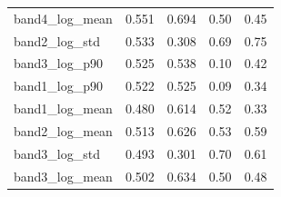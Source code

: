 \documentclass[11pt,a4paper]{article}
\begin{document}
\begin{center}
\begin{longtable}{>{\raggedright\arraybackslash}p{4.20cm}>{\raggedleft\arraybackslash}p{2.55cm}>{\raggedleft\arraybackslash}p{2.55cm}>{\raggedleft\arraybackslash}p{2.55cm}>{\raggedleft\arraybackslash}p{2.55cm}}
\hspace{0pt}band4\_\allowbreak{}log\_\allowbreak{}mean & \hspace{0pt}0.551 & \hspace{0pt}0.694 & \hspace{0pt}0.50 & \hspace{0pt}0.45\\
\hspace{0pt}band2\_\allowbreak{}log\_\allowbreak{}std & \hspace{0pt}0.533 & \hspace{0pt}0.308 & \hspace{0pt}0.69 & \hspace{0pt}0.75\\
\hspace{0pt}band3\_\allowbreak{}log\_\allowbreak{}p90 & \hspace{0pt}0.525 & \hspace{0pt}0.538 & \hspace{0pt}0.10 & \hspace{0pt}0.42\\
\hspace{0pt}band1\_\allowbreak{}log\_\allowbreak{}p90 & \hspace{0pt}0.522 & \hspace{0pt}0.525 & \hspace{0pt}0.09 & \hspace{0pt}0.34\\
\hspace{0pt}band1\_\allowbreak{}log\_\allowbreak{}mean & \hspace{0pt}0.480 & \hspace{0pt}0.614 & \hspace{0pt}0.52 & \hspace{0pt}0.33\\
\hspace{0pt}band2\_\allowbreak{}log\_\allowbreak{}mean & \hspace{0pt}0.513 & \hspace{0pt}0.626 & \hspace{0pt}0.53 & \hspace{0pt}0.59\\
\hspace{0pt}band3\_\allowbreak{}log\_\allowbreak{}std & \hspace{0pt}0.493 & \hspace{0pt}0.301 & \hspace{0pt}0.70 & \hspace{0pt}0.61\\
\hspace{0pt}band3\_\allowbreak{}log\_\allowbreak{}mean & \hspace{0pt}0.502 & \hspace{0pt}0.634 & \hspace{0pt}0.50 & \hspace{0pt}0.48\\
\end{longtable}\end{center}
\end{document}
